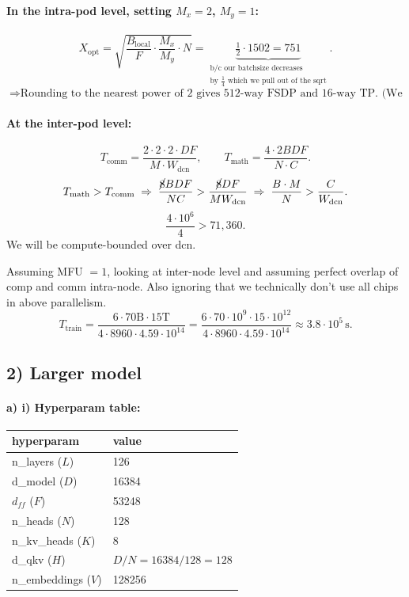 \documentclass[11pt]{article}
\newcommand{\Tmath}{T_{\text{math}}}
\newcommand{\Tcomm}{T_{\text{comm}}}
\newcommand{\Ttrain}{T_{\text{train}}}
\newcommand{\Wdcn}{W_{\text{dcn}}}
\begin{document}
\paragraph{In the intra-pod level, setting $M_x = 2$, $M_y = 1$:}
\[
X_{\text{opt}} = \sqrt{\frac{B_{\text{local}}}{F} \cdot \frac{M_x}{M_y} \cdot N} = \underbrace{\tfrac{1}{2} \cdot 1502 = 751}_{\substack{\text{b/c our batchsize decreases} \\ \text{by $\tfrac{1}{4}$ which we pull out of the sqrt}}}.
\]
\[
\Rightarrow \text{Rounding to the nearest power of 2 gives 512-way FSDP and 16-way TP. (We have chips left over though.)}
\]

\paragraph{At the inter-pod level:}
\[
\Tcomm = \frac{2 \cdot 2 \cdot 2 \cdot DF}{M \cdot \Wdcn}, \qquad \Tmath = \frac{4 \cdot 2BDF}{N \cdot C}.
\]
\[
\Tmath > \Tcomm \;\Rightarrow\; \frac{\cancel{8}BDF}{NC} > \frac{\cancel{8}DF}{M \Wdcn} \;\Rightarrow\; \frac{B \cdot M}{N} > \frac{C}{\Wdcn}.
\]
\[
\frac{4 \cdot 10^6}{4} > 71{,}360.
\]
We will be compute-bounded over dcn.

Assuming MFU $= 1$, looking at inter-node level and assuming perfect overlap of comp and comm intra-node. Also ignoring that we technically don't use all chips in above parallelism.
\[
\Ttrain = \frac{6 \cdot 70\text{B} \cdot 15\text{T}}{4 \cdot 8960 \cdot 4.59 \cdot 10^{14}}
        = \frac{6 \cdot 70 \cdot 10^9 \cdot 15 \cdot 10^{12}}{4 \cdot 8960 \cdot 4.59 \cdot 10^{14}} \approx 3.8 \cdot 10^5\,\text{s}.
\]

\subsection*{2) Larger model}

\paragraph{a) i) Hyperparam table:}

\begin{center}
\begin{tabular}{l|l}
\textbf{hyperparam} & \textbf{value} \\ \hline
n\_layers ($L$)     & 126 \\
d\_model ($D$)      & 16384 \\
$d_{ff}$ ($F$)      & 53248 \\
n\_heads ($N$)      & 128 \\
n\_kv\_heads ($K$)  & 8 \\
d\_qkv ($H$)        & $D/N = 16384/128 = 128$ \\
n\_embeddings ($V$) & 128256 \\
\end{tabular}
\end{center}
\end{document}
